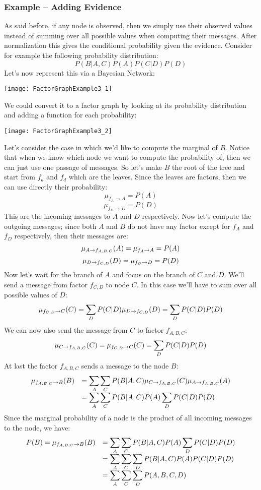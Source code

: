 \subsubsection{Example -- Adding Evidence}
As said before, if any node is observed, then we simply use their observed values instead of summing over all possible values when computing their messages. After normalization this gives the conditional probability given the evidence. \newline
Consider for example the following probability distribution:
\[P(B\vert A,C)P(A)P(C\vert D)P(D)\]
Let's now represent this via a Bayesian Network:
\begin{center}
  \texttt{[image: FactorGraphExample3\_1]}
\end{center}
We could convert it to a factor graph by looking at its probability distribution and adding a function for each probability:
\begin{center}
  \texttt{[image: FactorGraphExample3\_2]}
\end{center}
Let's consider the case in which we'd like to compute the marginal of $B$. Notice that when we know which node we want to compute the probability of, then we can just use one passage of messages. So let's make $B$ the root of the tree and start from $f_a$ and $f_d$ which are the leaves. Since the leaves are factors, then we can use directly their probability:
\[\mu_{f_A\rightarrow A}=P(A)\]
\[\mu_{f_D\rightarrow D}=P(D)\]
This are the incoming messages to $A$ and $D$ respectively. Now let's compute the outgoing messages; since both $A$ and $B$ do not have any factor except for $f_A$ and $f_D$ respectively, then their messages are:
\[\mu_{A\rightarrow f_{A,B,C}}(A)=\mu_{f_A\rightarrow A}=P(A)\]
\[\mu_{D\rightarrow f_{C,D}}(D)=\mu_{f_D\rightarrow D}=P(D)\]
Now let's wait for the branch of $A$ and focus on the branch of $C$ and $D$. We'll send a message from factor $f_{C,D}$ to node $C$. In this case we'll have to sum over all possible values of $D$: 
\[\mu_{f_{C,D}\rightarrow C}(C)=\displaystyle\sum_{D}P(C\vert D)\mu_{D\rightarrow f_{C,D}}(D)=\displaystyle\sum_DP(C\vert D)P(D)\]
We can now also send the message from $C$ to factor $f_{A,B,C}$:
\[\mu_{C\rightarrow f_{A,B,C}}(C)=\mu_{f_{C,D}\rightarrow C}(C)=\displaystyle\sum_DP(C\vert D)P(D)\]
At last the factor $f_{A,B,C}$ sends a message to the node $B$:
\[
  \begin{array}{ll}
    \mu_{f_{A,B,C}\rightarrow B}(B)&=\displaystyle\sum_A\displaystyle\sum_CP(B\vert A,C)\mu_{C\rightarrow f_{A,B,C}}(C)\mu_{A\rightarrow f_{A,B,C}}(A)\\
                         &=\displaystyle\sum_A\displaystyle\sum_CP(B\vert A,C)P(A)\displaystyle\sum_DP(C\vert D)P(D)
  \end{array}
\]
Since the marginal probability of a node is the product of all incoming messages to the node, we have:
\[
  \begin{array}{ll}
    P(B)=\mu_{f_{A,B,C}\rightarrow B}(B)&=\displaystyle\sum_A\displaystyle\sum_CP(B\vert A,C)P(A)\displaystyle\sum_DP(C\vert D)P(D)\\
                              &=\displaystyle\sum_A\displaystyle\sum_C\displaystyle\sum_DP(B\vert A, C)P(A)P(C\vert D)P(D)\\
                              &=\displaystyle\sum_A\displaystyle\sum_C\displaystyle\sum_DP(A,B,C,D)
  \end{array}
\]
%
